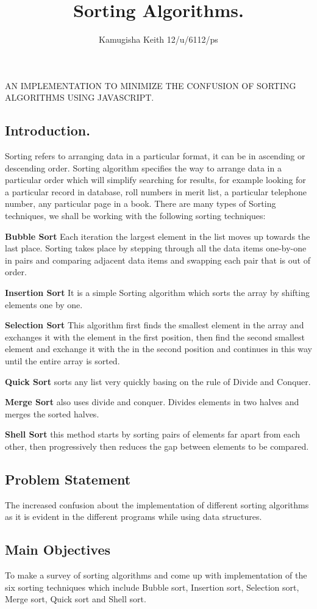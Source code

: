 \documentclass{article}
\title{Sorting Algorithms.}
\author{Kamugisha Keith 12/u/6112/ps}
\begin{document}
AN IMPLEMENTATION TO MINIMIZE THE CONFUSION OF SORTING ALGORITHMS USING JAVASCRIPT. 
\subsection{Introduction.}
	Sorting refers to arranging data in a particular format, it can be in ascending or descending order. Sorting algorithm specifies the way to arrange data in a particular order which will simplify searching for results, for example looking for a particular record in database, roll numbers in merit list, a particular telephone number, any particular page in a book.
	There are many types of Sorting techniques, we shall be working with the following sorting techniques:\par
		\textbf{Bubble Sort} Each iteration the largest element in the list moves up towards the last place. Sorting takes place by stepping through all the data items one-by-one in pairs and comparing adjacent data items and swapping each pair that is out of order.\par
		\textbf{Insertion Sort} It is a simple Sorting algorithm which sorts the array by shifting elements one by one.\par
		\textbf{Selection Sort} This algorithm first finds the smallest element in the array and exchanges it with the element in the first position, then find the second smallest element and exchange it with the  in the second position and continues in this way until the entire array is sorted.\par
		\textbf{Quick Sort} sorts any list very quickly basing on the rule of Divide and Conquer.\par
		\textbf{Merge Sort} also uses divide and conquer. Divides elements in two halves and merges the sorted halves.\par
		\textbf{Shell Sort} this method starts by sorting pairs of elements far apart from each other, then progressively then reduces the gap between elements to be compared.

\subsection {Problem Statement}
	The increased confusion about the implementation of different sorting algorithms as it is evident in the different programs while using data structures.

\subsection*{Main Objectives}
	To make a survey of sorting algorithms and come up with implementation of the six sorting techniques which include  Bubble sort, Insertion sort, Selection sort, Merge sort, Quick sort and Shell sort.
\end{document}
